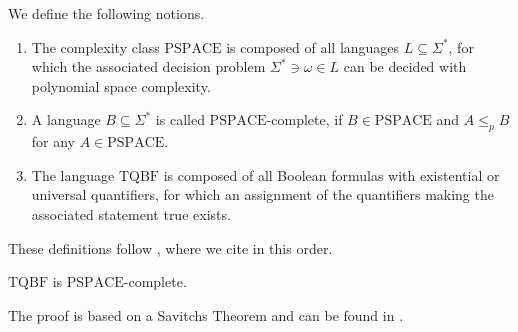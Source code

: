\begin{definition}
    We define the following notions.
    \begin{enumerate}[label=(\roman*)]
        \item The complexity class \(\text{PSPACE}\) is composed of all languages \(L \subseteq \Sigma^*\), for which the associated decision problem \(\Sigma^* \ni \omega \in L\) can be decided with polynomial space complexity.
        \item A language \(B \subseteq \Sigma^*\) is called \(\text{PSPACE}\)-complete, if \(B \in \text{PSPACE}\) and \(A \leq_p B\) for any \(A \in \text{PSPACE}\).
        \item The language \(\text{TQBF}\) is composed of all Boolean formulas with existential or universal quantifiers, for which an assignment of the quantifiers making the associated statement true exists.
    \end{enumerate}
\end{definition}
These definitions follow \cite[pp. 336-338]{Sipser2013}, where we cite in this order.
\begin{theorem} \label{tqbf_pspace_complete}
    \(\text{TQBF}\) is \(\text{PSPACE}\)-complete.
\end{theorem}
The proof is based on a Savitchs Theorem and can be found in \cite[pp. 339-341]{Sipser2013}.

\phantom{}

